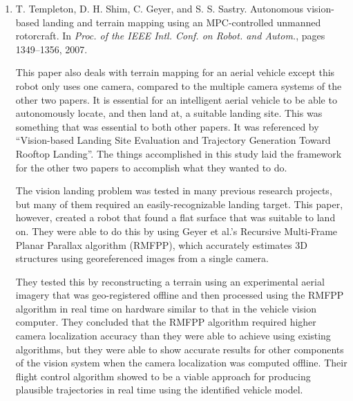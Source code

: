 \documentclass[12pt]{article}
\begin{document}
\begin{enumerate}
\item T. Templeton, D. H. Shim, C. Geyer, and S. S. Sastry. Autonomous vision-based landing and terrain mapping using an MPC-controlled unmanned rotorcraft. In \textit{Proc. of the IEEE Intl. Conf. on Robot. and Autom.}, pages 1349–1356, 2007. \newline \newline


	This paper also deals with terrain mapping for an aerial vehicle except this robot 
	only uses one camera, compared to the multiple camera systems of the other two papers. 
	It is essential for an intelligent aerial vehicle to be able to autonomously locate, 
	and then land at, a suitable landing site. This was something that was essential to 
	both other papers. It was referenced by “Vision-based Landing Site Evaluation and 
	Trajectory Generation Toward Rooftop Landing”. The things accomplished in this study 
	laid the framework for the other two papers to accomplish what they wanted to do. \newline 

	The vision landing problem was tested in many previous research projects, but many of 
	them required an easily-recognizable landing target. This paper, however, created a 
	robot that found a flat surface that was suitable to land on. They were able to do 
	this by using Geyer et al.’s Recursive Multi-Frame Planar Parallax algorithm (RMFPP), 
	which accurately estimates 3D structures using georeferenced images from a single 
	camera.  \newline

	They tested this by reconstructing a terrain using an experimental aerial imagery that 
	was geo-registered offline and then processed using the RMFPP algorithm in real time 
	on hardware similar to that in the vehicle vision computer. They concluded that the 
	RMFPP algorithm required higher camera localization accuracy than they were able to 
	achieve using existing algorithms, but they were able to show accurate results for 
	other components of the vision system when the camera localization was computed 
	offline. Their flight control algorithm showed to be a viable approach for producing 
	plausible trajectories in real time using the identified vehicle model. \newline


\end{enumerate}
\end{document}
